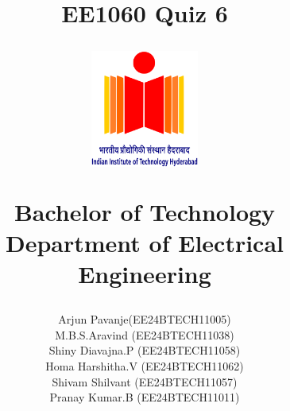 \documentclass[12pt,a4paper]{report}
\begin{document}
\title{\textbf{EE1060 Quiz 6}\\
\LARGE{\textbf{ }}

\author{ Arjun Pavanje(EE24BTECH11005)\\M.B.S.Aravind (EE24BTECH11038)\\Shiny Diavajna.P (EE24BTECH11058)\\Homa Harshitha.V (EE24BTECH11062)\\Shivam Shilvant (EE24BTECH11057)\\Pranay Kumar.B (EE24BTECH11011)}

\begin{center}
\end{center}
\vspace{30pt}
\begin{figure}[ht]
	\centering
	\includegraphics[width = 100pt]{logo.png}\\
\end{figure}
\begin{center}
	Bachelor of Technology\\
	\vspace{10pt}
	Department of Electrical Engineering\\
\end{center}
}
\maketitle
\end{document}
